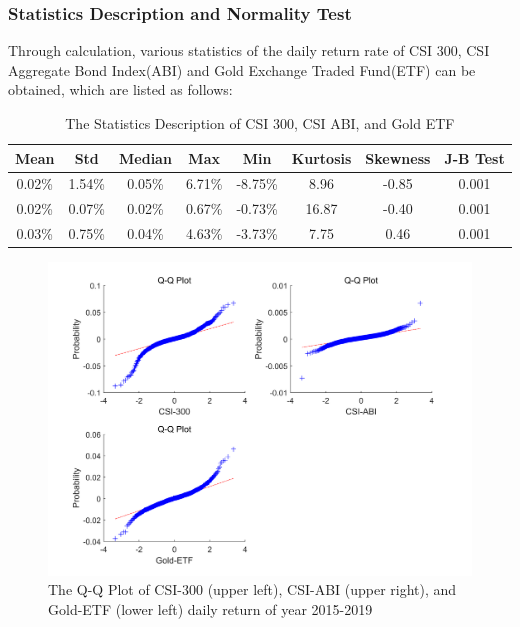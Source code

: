 \subsubsection{Statistics Description and Normality Test}
Through calculation, various statistics of the daily return rate of CSI 300, CSI Aggregate Bond Index(ABI) and Gold Exchange Traded Fund(ETF) can be obtained, which are listed as follows:
\begin{table}[H]
\centering
\begin{tabular}{|c|c|c|c|c|c|c|c|}
\hline
{\bf Mean} &  {\bf Std} & {\bf Median} &  {\bf Max} &  {\bf Min} & {\bf Kurtosis} & {\bf Skewness} & {\bf J-B Test} \\
\hline
    0.02\% &     1.54\% &     0.05\% &     6.71\% &    -8.75\% &      8.96  &     -0.85  &      0.001 \\
\hline
    0.02\% &     0.07\% &     0.02\% &     0.67\% &    -0.73\% &     16.87  &     -0.40  &      0.001 \\
\hline
    0.03\% &     0.75\% &     0.04\% &     4.63\% &    -3.73\% &      7.75  &      0.46  &      0.001 \\
\hline
\end{tabular}  
\caption{The Statistics Description of CSI 300, CSI ABI, and Gold ETF }
\label{Tab1}
\end{table}

\begin{figure}[H]
    \centering
    \includegraphics[scale=0.8]{Figure/FIG2-Q-Q.png}
    \caption{The Q-Q Plot of CSI-300 (upper left), CSI-ABI (upper right), and
Gold-ETF (lower left) daily return of year 2015-2019}
    \label{Fig2}
\end{figure}

